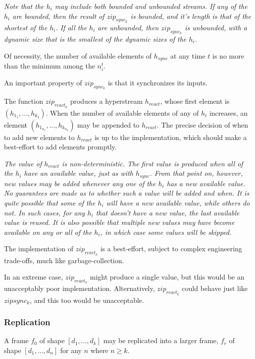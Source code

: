 \documentclass{article}
\begin{document}
{\em
Note that the $h_i$ may include both bounded and unbounded streams. If any of the $h_i$ are bounded, then the result of $zip_{sync_k}$ is bounded, and it's length is that of the shortest of the $h_i$. If all  the $h_i$ are unbounded, then $zip_{sync_k}$ is unbounded, with a dynamic size that is the smallest of the dynamic sizes of the $h_i$.

Of necessity, the number of available elements of $h_{sync}$ at any time $t$ is no more than the minimum among the $n_i^t$.

An important property of $zip_{sync_k}$ is that it synchronizes its inputs.
}

The function $zip_{react_k}$  produces a hyperstream $h_{react}$, whose first element is $(h_{1_1}, \ldots, h_{k_1})$. When the number of available elements of any of $h_i$ increases, an element $(h_{1_{n_1}}, \ldots, h_{k_{n_k}})$ may be appended to $h_{react}$. The precise decision of when to add new elements to $h_{react}$ is up to the
implementation, which should make a best-effort to add elements promptly.

{\em
The value of $h_{react}$ is non-deterministic. The first value is produced when all of the $h_i$ have an available value, just as with $h_{sync}$. From that point on, however,
new values may be added whenever any one of the $h_i$ has a new available value. No guarantees are made as to whether such a value will be added and when. It is quite possible that some of the $h_i$ will have a new available value, while others do not. In such cases, for any $h_i$ that doesn't have a new value,  the last available value is reused.
It is also possible that multiple new values may have become available on any or all of the $h_i$, in which case some values will be skipped.

The implementation of $zip_{react_k}$ is a best-effort, subject to complex engineering trade-offs, much like garbage-collection.

In an extreme case, $zip_{react_k}$ might produce a single value, but this would be an unacceptably poor implementation. Alternatively, $zip_{react_k}$ could behave just like 
$zip{sync_k}$, and this too would be unacceptable.
}

\subsubsection{Replication}
\label{replication}

A frame $f_0$ of shape $[d_1, \ldots, d_k]$ may be replicated into a larger frame, $f_r$ of shape $[d_1, \ldots, d_n]$ for any $n$ where $n \ge k$. 
\end{document}

